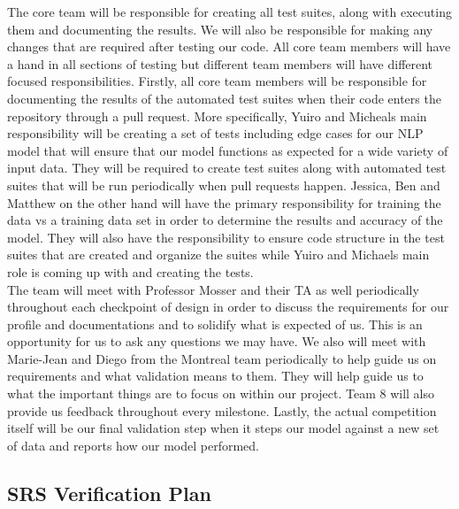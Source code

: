 \documentclass[12pt, titlepage]{article}
\begin{document}
  The core team will be responsible for creating all test suites, along with executing them and documenting the results. We will also be responsible for making any changes that are required after testing our code. All core team members will have a hand in all sections of testing but different team members will have different focused responsibilities. Firstly, all core team members will be responsible for documenting the results of the automated test suites when their code enters the repository through a pull request. More specifically, Yuiro and Micheals main responsibility will be creating a set of tests including edge cases for our NLP model that will ensure that our model functions as expected for a wide variety of input data. They will be required to create test suites along with automated test suites that will be run periodically when pull requests happen. Jessica, Ben and Matthew on the other hand will have the primary responsibility for training the data vs a training data set in order to determine the results and accuracy of the model. They will also have the responsibility to ensure code structure in the test suites that are created and organize the suites while Yuiro and Michaels main role is coming up with and creating the tests. \\
  
  The team will meet with Professor Mosser and their TA as well periodically throughout each checkpoint of design in order to discuss the requirements for our profile and documentations and to solidify what is expected of us. This is an opportunity for us to ask any questions we may have. We also will meet with Marie-Jean and Diego from the Montreal team periodically to help guide us on requirements and what validation means to them. They will help guide us to what the important things are to focus on within our project. Team 8 will also provide us feedback throughout every milestone. Lastly, the actual competition itself will be our final validation step when it steps our model against a new set of data and reports how our model performed. \\
  
  \subsection{SRS Verification Plan}
  
\end{document}
